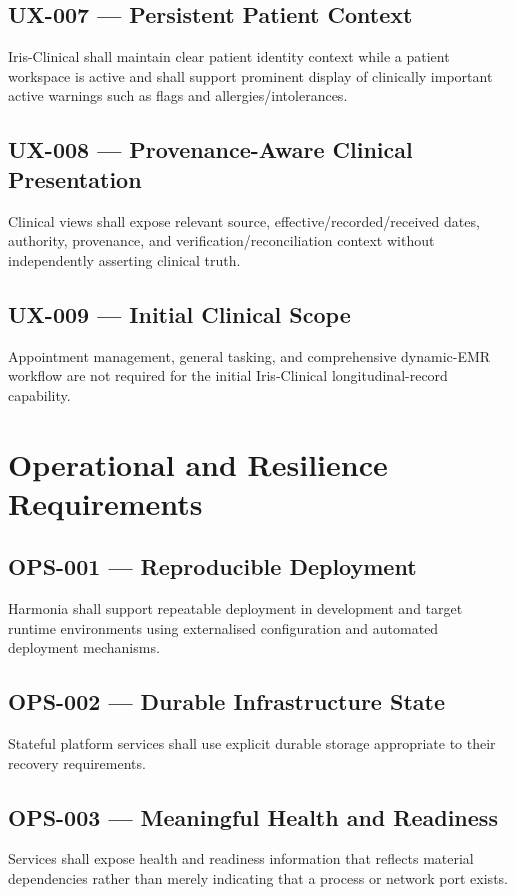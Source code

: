 \subsection{UX-007 --- Persistent Patient Context}
Iris-Clinical shall maintain clear patient identity context while a patient workspace is active and shall support prominent display of clinically important active warnings such as flags and allergies/intolerances.

\subsection{UX-008 --- Provenance-Aware Clinical Presentation}
Clinical views shall expose relevant source, effective/recorded/received dates, authority, provenance, and verification/reconciliation context without independently asserting clinical truth.

\subsection{UX-009 --- Initial Clinical Scope}
Appointment management, general tasking, and comprehensive dynamic-EMR workflow are not required for the initial Iris-Clinical longitudinal-record capability.

\section{Operational and Resilience Requirements}

\subsection{OPS-001 --- Reproducible Deployment}
Harmonia shall support repeatable deployment in development and target runtime environments using externalised configuration and automated deployment mechanisms.

\subsection{OPS-002 --- Durable Infrastructure State}
Stateful platform services shall use explicit durable storage appropriate to their recovery requirements.

\subsection{OPS-003 --- Meaningful Health and Readiness}
Services shall expose health and readiness information that reflects material dependencies rather than merely indicating that a process or network port exists.

